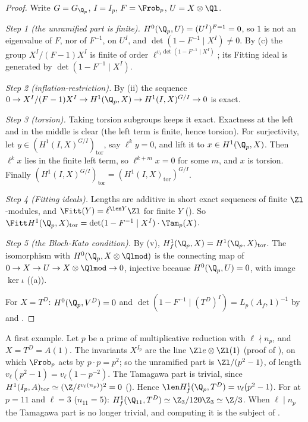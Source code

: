 \begin{proof}
Write $G=G_{\Q_p}$, $I=I_p$, $F=\Frob_p$, $U=X\otimes\Ql$.

\emph{Step 1 (the unramified part is finite).} $H^0(\Q_p,U)=(U^I)^{F=1}=0$, so $1$ is not an eigenvalue of $F$, nor of $F^{-1}$, on $U^I$, and $\det(1-F^{-1}\mid X^I)\ne0$. By
(c) the group $X^I/(F-1)X^I$ is finite of order $\ell^{v_\ell\det(1-F^{-1}\mid X^I)}$; its Fitting ideal is generated by
$\det(1-F^{-1}\mid X^I)$.

\emph{Step 2 (inflation-restriction).} By (ii) the sequence $0\to X^I/(F-1)X^I\to H^1(\Q_p,X)\to H^1(I,X)^{G/I}\to0$ is exact.

\emph{Step 3 (torsion).} Taking torsion subgroups keeps it exact. Exactness at the left and in the middle is clear (the left term is finite, hence torsion). For
surjectivity, let $y\in(H^1(I,X)^{G/I})_{\mathrm{tor}}$, say $\ell^ky=0$, and lift it to $x\in H^1(\Q_p,X)$. Then $\ell^kx$ lies in the finite left term, so $\ell^{k+m}x=0$ for some $m$,
and $x$ is torsion. Finally $(H^1(I,X)^{G/I})_{\mathrm{tor}}=(H^1(I,X)_{\mathrm{tor}})^{G/I}$.

\emph{Step 4 (Fitting ideals).} Lengths are additive in short exact sequences of finite $\Zl$-modules, and $\Fitt(Y)=\ell^{\len Y}\Zl$ for finite $Y$ (). So
$\Fitt H^1(\Q_p,X)_{\mathrm{tor}}=\det(1-F^{-1}\mid X^I)\cdot\Tam_p(X)$.

\emph{Step 5 (the Bloch-Kato condition).} By (v), $H^1_f(\Q_p,X)=H^1(\Q_p,X)_{\mathrm{tor}}$. The isomorphism with $H^0(\Q_p,X\otimes\Qlmod)$ is the
connecting map of $0\to X\to U\to X\otimes\Qlmod\to0$, injective because $H^0(\Q_p,U)=0$, with image $\ker\iota$ ((a)).

For $X=T^D$: $H^0(\Q_p,V^D)=0$ and $\det(1-F^{-1}\mid(T^D)^I)=L_p(A_f,1)^{-1}$ by  and .
\end{proof}

A first example. Let $p$ be a prime of multiplicative reduction with $\ell\nmid n_p$, and $X=T^D=A(1)$. The invariants $X^{I_p}$ are the line $\Zl e\otimes\Zl(1)$ (proof of
), on which $\Frob_p$ acts by $p\cdot p=p^2$; so the unramified part is $\Zl/(p^2-1)$, of length $v_\ell(p^2-1)=v_\ell(1-p^{-2})$. The Tamagawa
part is trivial, since $H^1(I_p,A)_{\mathrm{tor}}\simeq(\Z/\ell^{v_\ell(n_p)})^2=0$ (). Hence $\len H^1_f(\Q_p,T^D)=v_\ell(p^2-1)$. For  at
$p=11$ and $\ell=3$ ($n_{11}=5$): $H^1_f(\Q_{11},T^D)\simeq\Z_3/120\Z_3\simeq\Z/3$. When $\ell\mid n_p$ the Tamagawa part is no longer trivial, and computing it is the subject of
.

